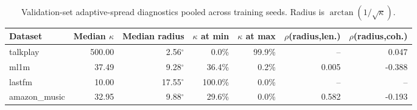 \begin{table}[t]
\centering\scriptsize
\begin{tabular}{lrrrrrr}
\toprule
Dataset & Median $\kappa$ & Median radius & $\kappa$ at min & $\kappa$ at max & $\rho$(radius,len.) & $\rho$(radius,coh.) \\
\midrule
talkplay & 500.00 & 2.56$^\circ$ & 0.0\% & 99.9\% & -- & 0.047 \\
ml1m & 37.49 & 9.28$^\circ$ & 36.4\% & 0.2\% & 0.005 & -0.388 \\
lastfm & 10.00 & 17.55$^\circ$ & 100.0\% & 0.0\% & -- & -- \\
amazon\_music & 32.95 & 9.88$^\circ$ & 29.6\% & 0.0\% & 0.582 & -0.193 \\
\bottomrule
\end{tabular}
\caption{Validation-set adaptive-spread diagnostics pooled across training seeds. Radius is $\arctan(1/\sqrt{\kappa})$.}
\label{tab:ecir-kappa-diagnostics}
\end{table}
